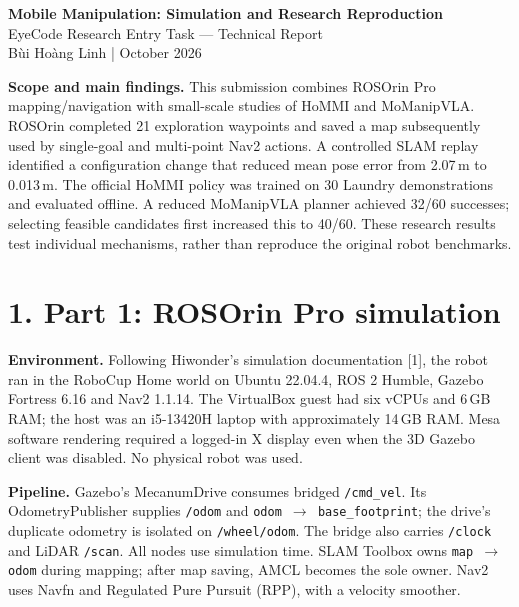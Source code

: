 \documentclass[10pt,a4paper]{article}
\newcommand{\artifact}[1]{\texttt{\small #1}}
\begin{document}
\begin{center}
{\LARGE\bfseries Mobile Manipulation: Simulation and Research Reproduction}\\[5pt]
{\large EyeCode Research Entry Task --- Technical Report}\\[4pt]
B\`ui Ho\`ang Linh \quad | \quad October 2026
\end{center}
\textbf{Scope and main findings.} This submission combines ROSOrin Pro mapping/navigation with small-scale studies of HoMMI and MoManipVLA. ROSOrin completed 21 exploration waypoints and saved a map subsequently used by single-goal and multi-point Nav2 actions. A controlled SLAM replay identified a configuration change that reduced mean pose error from 2.07\,m to 0.013\,m. The official HoMMI policy was trained on 30 Laundry demonstrations and evaluated offline. A reduced MoManipVLA planner achieved 32/60 successes; selecting feasible candidates first increased this to 40/60. These research results test individual mechanisms, rather than reproduce the original robot benchmarks.

\section*{1. Part 1: ROSOrin Pro simulation}
\textbf{Environment.} Following Hiwonder's simulation documentation [1], the robot ran in the RoboCup Home world on Ubuntu 22.04.4, ROS 2 Humble, Gazebo Fortress 6.16 and Nav2 1.1.14. The VirtualBox guest had six vCPUs and 6\,GB RAM; the host was an i5-13420H laptop with approximately 14\,GB RAM. Mesa software rendering required a logged-in X display even when the 3D Gazebo client was disabled. No physical robot was used.

\textbf{Pipeline.} Gazebo's MecanumDrive consumes bridged \artifact{/cmd\_vel}. Its OdometryPublisher supplies \artifact{/odom} and \artifact{odom $\rightarrow$ base\_footprint}; the drive's duplicate odometry is isolated on \artifact{/wheel/odom}. The bridge also carries \artifact{/clock} and LiDAR \artifact{/scan}. All nodes use simulation time. SLAM Toolbox owns \artifact{map $\rightarrow$ odom} during mapping; after map saving, AMCL becomes the sole owner. Nav2 uses Navfn and Regulated Pure Pursuit (RPP), with a velocity smoother.
\end{document}
